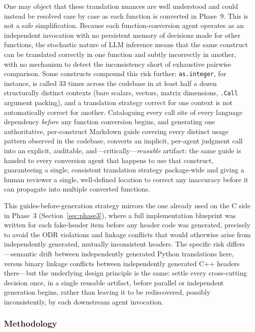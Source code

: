\documentclass[12pt]{article}
\begin{document}
One may object that these translation nuances are well understood and could instead be resolved case by case as each function is converted in Phase~9. This is not a safe simplification. Because each function-conversion agent operates as an independent invocation with no persistent memory of decisions made for other functions, the stochastic nature of LLM inference means that the same construct can be translated correctly in one function and subtly incorrectly in another, with no mechanism to detect the inconsistency short of exhaustive pairwise comparison. Some constructs compound this risk further: \texttt{as.integer}, for instance, is called 33 times across the codebase in at least half a dozen structurally distinct contexts (bare scalars, vectors, matrix dimensions, \texttt{.Call} argument packing), and a translation strategy correct for one context is not automatically correct for another. Cataloguing every call site of every language dependency \emph{before} any function conversion begins, and generating one authoritative, per-construct Markdown guide covering every distinct usage pattern observed in the codebase, converts an implicit, per-agent judgment call into an explicit, auditable, and---critically---\emph{reusable} artifact: the same guide is handed to every conversion agent that happens to use that construct, guaranteeing a single, consistent translation strategy package-wide and giving a human reviewer a single, well-defined location to correct any inaccuracy before it can propagate into multiple converted functions.

This guides-before-generation strategy mirrors the one already used on the C side in Phase~3 (Section~\ref{sec:phase3}), where a full implementation blueprint was written for each fake-header item before any header code was generated, precisely to avoid the ODR violations and linkage conflicts that would otherwise arise from independently generated, mutually inconsistent headers. The specific risk differs---semantic drift between independently generated Python translations here, versus binary linkage conflicts between independently generated C++ headers there---but the underlying design principle is the same: settle every cross-cutting decision once, in a single reusable artifact, before parallel or independent generation begins, rather than leaving it to be rediscovered, possibly inconsistently, by each downstream agent invocation.

\subsubsection{Methodology}
\end{document}
